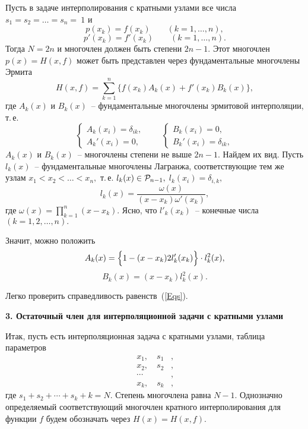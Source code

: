 Пусть в задаче интерполирования с кратными узлами
все числа $s_1=s_2= \dots =s_n=~1$ и
$$
   p(x_k)=f(x_k)\qquad (k=1,\dots ,n),
   $$
   $$
   p'(x_k)=f'(x_k)\qquad (k=1,\dots ,n).
$$
Тогда $N=2n$
и многочлен должен быть степени $2n-1.$
Этот многочлен $p(x)=H(x,f)$
может быть представлен через фундаментальные
многочлены Эрмита
\[
  H(x,f)=\sum\limits_{k=1}^{n} \{f(x_k) A_k(x)+f'(x_k)B_k(x)\},
\]
где $A_k(x)$ и $B_k(x)$~-- фундаментальные многочлены эрмитовой
интерполяции, т.\,е.
\begin{equation}
\label{Eqs}
  \begin{cases}
        A_k(x_i)=\delta_{ik},\\
        A_k'(x_i)=0,
  \end{cases}
  \qquad
  \begin{cases}
        B_k(x_i)=0, \\
        B_k'(x_i)=\delta_{ik},
  \end{cases}
\end{equation}
$A_k(x)$ и $B_k(x)$~-- многочлены степени не выше $2n-1.$
Найдем их вид. Пусть $l_k(x)$~-- фундаментальные многочлены
Лагранжа, соответствующие {тем же} узлам $x_1<x_2< \dots
<x_n,$ т.\,е. $l_k(x) \in \mathcal{P}_{n-1},$
$l_k(x_i)=\delta_{i,k},$
\[
  l_k(x)=\frac{\omega (x)}{(x-x_k)\omega '(x_k)},
\]
где $\omega (x)=\prod\limits_{k=1}^n (x-x_k).$
{Ясно, что $l'_k(x_k)$~-- конечные числа $(k=1,2,\ldots,n).$}

Значит, {можно положить}
$$
   A_k(x)=\Bigl\{ 1-(x-x_k)2l'_k(x_k) \Bigr\}\cdot l^2_k(x),
   $$
   $$
   B_k(x)=(x-x_k)l_k^2(x).
$$

Легко проверить справедливость равенств~(\ref{Eqs}).

\vspace{5mm}
{\bf 3. Остаточный член для интерполяционной задачи с
   кратными узлами}
   \vspace{5mm}

Итак, пусть есть интерполяционная задача с кратными
узлами, таблица параметров
\begin{align*}
x_1, \quad s_1&,  \\
x_2, \quad s_2&,  \\
  \cdots\quad \quad &,          \\
x_k, \quad s_k&,
\end{align*}
где $s_1+s_2+\cdots{+} s_k+k=N.$ {Степень} многочлена
{равна} $N-1.$ {Однозначно определяемый соответствующий
многочлен кратного интерполирования для} {функции $f$ будем
обозначать через $H(x)=H(x,f).$}

